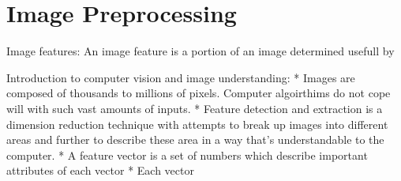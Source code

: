 \chapter{Image Preprocessing}
Image features:  An image feature is a portion of an image determined usefull by 


Introduction to computer vision and image understanding:
    * Images are composed of thousands to millions of pixels.  Computer algoirthims do not cope will with such vast amounts of inputs.
    * Feature detection and extraction is a dimension reduction technique with attempts to break up images into different areas and further to describe these area in a way that's understandable to the computer.
    * A feature vector is a set of numbers which describe important attributes of each vector
    * Each vector 
    
